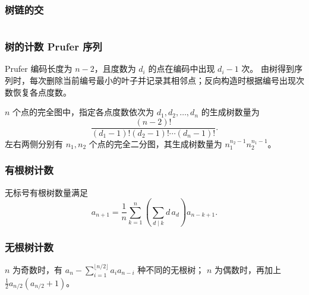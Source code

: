 \subsubsection{树链的交}
\inputminted{cpp}{sections/Tree/assets/yzh/path_inter.cpp}

\subsubsection{树的计数 Prufer 序列}
Prufer 编码长度为 ${n-2}$，且度数为 $d_i$ 的点在编码中出现 ${d_i-1}$ 次。
由树得到序列时，每次删除当前编号最小的叶子并记录其相邻点；反向构造时根据编号出现次数恢复各点度数。

$n$ 个点的完全图中，指定各点度数依次为 $d_1,d_2,\ldots,d_n$ 的生成树数量为
\[
  \frac{(n-2)!}{(d_1-1)!(d_2-1)!\cdots(d_n-1)!}.
\]
左右两侧分别有 $n_1,n_2$ 个点的完全二分图，其生成树数量为
$n_1^{n_2-1}n_2^{n_1-1}$。

\subsubsection{有根树计数}
无标号有根树数量满足
\[
  a_{n+1}=\frac1n\sum_{k=1}^{n}\left(\sum_{d\mid k}d\,a_d\right)a_{n-k+1}.
\]

\subsubsection{无根树计数}
$n$ 为奇数时，有 $a_n-\sum_{i=1}^{\lfloor n/2\rfloor}a_i a_{n-i}$ 种不同的无根树；
$n$ 为偶数时，再加上 $\frac12a_{n/2}(a_{n/2}+1)$。
